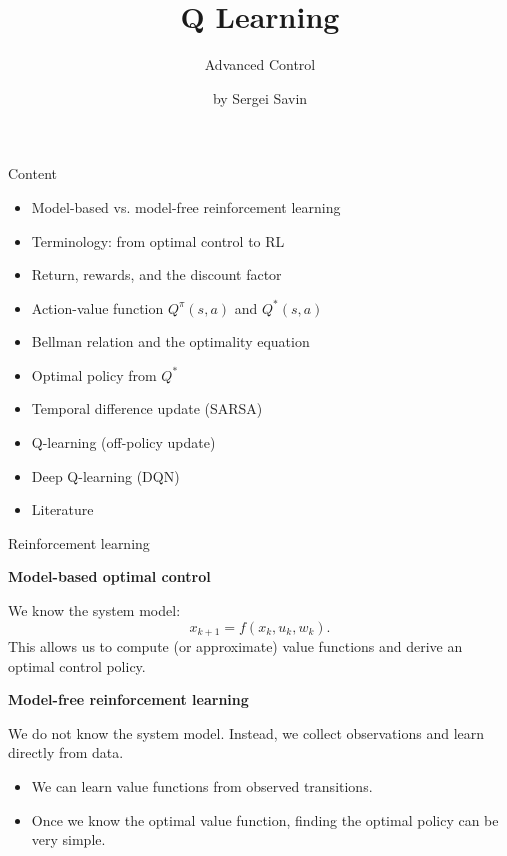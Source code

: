 \documentclass{beamer}
\subtitle{Advanced Control}
\author{by Sergei Savin}
\date{\mydate}
\title{Q Learning}
\begin{document}
\maketitle


\begin{frame}{Content}
	\begin{itemize}
		\item Model-based vs. model-free reinforcement learning
		\item Terminology: from optimal control to RL
		\item Return, rewards, and the discount factor
		\item Action-value function $Q^\pi(s,a)$ and $Q^*(s,a)$
		\item Bellman relation and the optimality equation
		\item Optimal policy from $Q^*$
		\item Temporal difference update (SARSA)
		\item Q-learning (off-policy update)
		\item Deep Q-learning (DQN)
		\item Literature
	\end{itemize}
\end{frame}


\begin{frame}{Reinforcement learning}
	\begin{flushleft}
		
		\textbf{Model-based optimal control}
		
		We know the system model:
		\[
		x_{k+1}=f(x_k,u_k,w_k).
		\]
		This allows us to compute (or approximate) value functions
		and derive an optimal control policy.
		
		\vspace{0.4cm}
		
		\textbf{Model-free reinforcement learning}
		
		We do not know the system model. Instead, we collect
		observations and learn directly from data.
		
		\vspace{0.3cm}
		
		\begin{itemize}
			\item We can learn value functions from observed transitions.
			\item Once we know the optimal value function, finding
			the optimal policy can be very simple.
		\end{itemize}
	\end{flushleft}
\end{frame}
\end{document}
